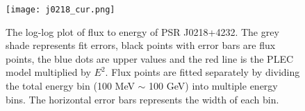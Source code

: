 \documentclass[a4paper, 12pt]{report}
\begin{document}
      \begin{table}[!htp]
        \centering
          \caption[Fit parameters of the spectra model of PSR J0218+4232.]
            {Fit parameters of the spectra model of PSR J0218+4232. 
            The names of parameters are consistent with Equation
            \ref{eq: fermi_model}. The previous results are reported by
            \cite{0067-0049-208-2-17}}
          \label{table: j0218_fit_result}        
      \end{table}  

      \begin{figure}[!htp]
        \centering 
        \texttt{[image: j0218\_cur.png]}
        \caption[The log-log plot of flux to energy of PSR J0218+4232.]
        {The log-log plot of flux to energy of PSR J0218+4232. The grey shade represents 
        fit errors, black points with error bars are flux points, the blue dots are upper values and the 
        red line is the PLEC model multiplied by $E^2$. Flux points 
        are fitted separately by dividing the total energy bin (100 MeV $\sim$ 100 GeV) into multiple energy bins.
        The horizontal error bars represents the width of each bin.}
        \label{fig: j0218_cur.png}
      \end{figure}
        
\end{document}

